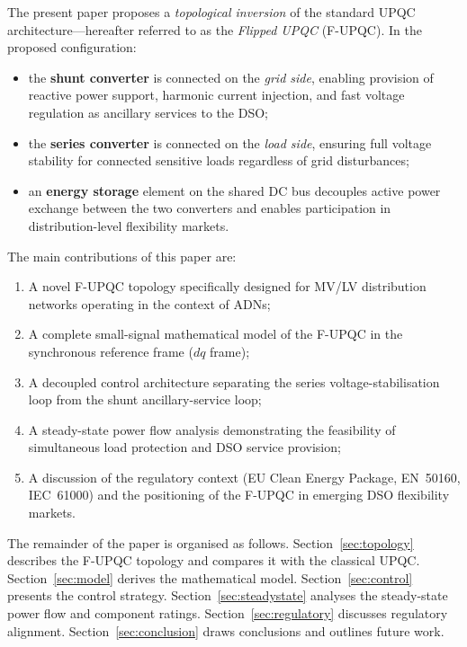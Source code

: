 \documentclass[conference]{IEEEtran}
\begin{document}
The present paper proposes a \emph{topological inversion} of the
standard UPQC architecture---hereafter referred to as the
\emph{Flipped UPQC} (F-UPQC). In the proposed configuration:
\begin{itemize}
  \item the \textbf{shunt converter} is connected on the \emph{grid
        side}, enabling provision of reactive power support, harmonic
        current injection, and fast voltage regulation as ancillary
        services to the DSO;
  \item the \textbf{series converter} is connected on the \emph{load
        side}, ensuring full voltage stability for connected sensitive
        loads regardless of grid disturbances;
  \item an \textbf{energy storage} element on the shared DC bus
        decouples active power exchange between the two converters
        and enables participation in distribution-level flexibility
        markets.
\end{itemize}

The main contributions of this paper are:
\begin{enumerate}
  \item A novel F-UPQC topology specifically designed for MV/LV
        distribution networks operating in the context of ADNs;
  \item A complete small-signal mathematical model of the F-UPQC in
        the synchronous reference frame ($dq$ frame);
  \item A decoupled control architecture separating the series
        voltage-stabilisation loop from the shunt ancillary-service
        loop;
  \item A steady-state power flow analysis demonstrating the
        feasibility of simultaneous load protection and DSO service
        provision;
  \item A discussion of the regulatory context (EU Clean Energy
        Package, EN~50160, IEC~61000) and the positioning of the
        F-UPQC in emerging DSO flexibility markets.
\end{enumerate}

The remainder of the paper is organised as follows.
Section~\ref{sec:topology} describes the F-UPQC topology and
compares it with the classical UPQC.
Section~\ref{sec:model} derives the mathematical model.
Section~\ref{sec:control} presents the control strategy.
Section~\ref{sec:steadystate} analyses the steady-state power flow
and component ratings.
Section~\ref{sec:regulatory} discusses regulatory alignment.
Section~\ref{sec:conclusion} draws conclusions and outlines future work.
\end{document}
